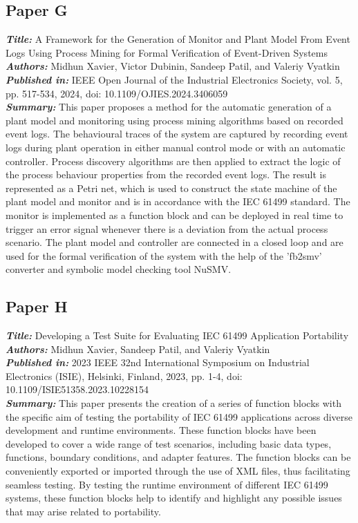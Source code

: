 \subsection{Paper G}
\textbf{\textit{Title:}} A Framework for the Generation of Monitor and Plant Model From Event Logs Using Process Mining for Formal Verification of Event-Driven Systems\\
\textbf{\textit{Authors:}} Midhun Xavier, Victor Dubinin, Sandeep Patil, and Valeriy Vyatkin\\
\textbf{\textit{Published in:}} IEEE Open Journal of the Industrial Electronics Society, vol. 5, pp. 517-534, 2024, doi: 10.1109/OJIES.2024.3406059\\
\textbf{\textit{Summary:}} This paper proposes a method for the automatic generation of a plant model and monitoring using process mining algorithms based on recorded event logs. The behavioural traces of the system are captured by recording event logs during plant operation in either manual control mode or with an automatic controller. Process discovery algorithms are then applied to extract the logic of the process behaviour properties from the recorded event logs. The result is represented as a Petri net, which is used to construct the state machine of the plant model and monitor and is in accordance with the IEC 61499 standard. The monitor is implemented as a function block and can be deployed in real time to trigger an error signal whenever there is a deviation from the actual process scenario. The plant model and controller are connected in a closed loop and are used for the formal verification of the system with the help of the 'fb2smv' converter and symbolic model checking tool NuSMV.\\

\subsection{Paper H}
\textbf{\textit{Title:}} Developing a Test Suite for Evaluating IEC 61499 Application Portability\\
\textbf{\textit{Authors:}} Midhun Xavier, Sandeep Patil, and Valeriy Vyatkin\\
\textbf{\textit{Published in:}} 2023 IEEE 32nd International Symposium on Industrial Electronics (ISIE), Helsinki, Finland, 2023, pp. 1-4, doi: 10.1109/ISIE51358.2023.10228154\\
\textbf{\textit{Summary:}} This paper presents the creation of a series of function blocks with the specific aim of testing the portability of IEC 61499 applications across diverse development and runtime environments. These function blocks have been developed to cover a wide range of test scenarios, including basic data types, functions, boundary conditions, and adapter features. The function blocks can be conveniently exported or imported through the use of XML files, thus facilitating seamless testing. By testing the runtime environment of different IEC 61499 systems, these function blocks help to identify and highlight any possible issues that may arise related to portability.\\


